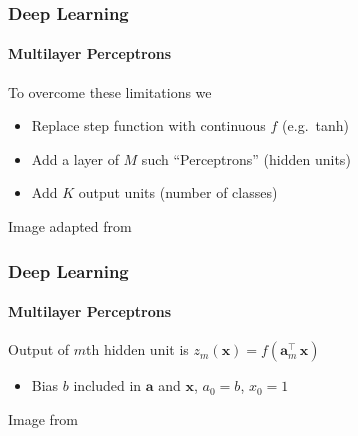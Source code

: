 \documentclass[xetex,professionalfont]{beamer}
\renewcommand{\vec}[1]{\ensuremath{\mathbf{#1}}}
\newcommand{\va}{\vec{a}}
\newcommand{\vx}{\vec{x}}
\renewcommand\emph[1]{\textcolor{tuwcvl_inf_red}{#1}}
\begin{document}
\begin{frame}
\frametitle{Deep Learning}
\framesubtitle{Multilayer Perceptrons}

To overcome these limitations we
\begin{itemize}
    \item Replace step function with continuous $f$ (e.g.\ tanh)
    \item Add a layer of $M$ such \enquote{Perceptrons} (\emph{hidden units})
    \item Add $K$ \emph{output units} (number of classes)
\end{itemize}

\medskip
\begin{center}
    {\centering Image adapted from \cite{bishop2006}}
\end{center}

\end{frame}


\begin{frame}
\frametitle{Deep Learning}
\framesubtitle{Multilayer Perceptrons}

Output of $m$th hidden unit is $z_m(\vx)=f(\va_m^\top\,\vx)$
\begin{itemize}
    \item Bias $b$ included in $\va$ and $\vx$, $a_0=b$, $x_0=1$
\end{itemize}

\bigskip
\begin{center}
    {\centering Image from \cite{bishop2006}}
\end{center}

\end{frame}
\end{document}
